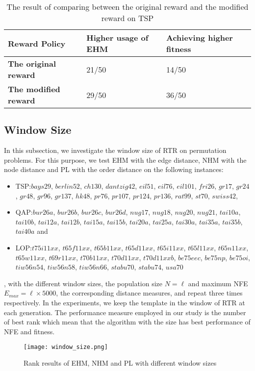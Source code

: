 \begin{table}[htbp]
    \centering
    \begin{tabular}{|l|l|l|}
    \hline
    \textbf{Reward Policy}       &\textbf{Higher usage of EHM}       & \textbf{Achieving higher fitness}  \\ \hline
    \textbf{The original reward} & 21/50 & 14/50   	 \\ \hline
    \textbf{The modified reward} & 29/50 & 36/50	\\ \hline
    \end{tabular} 
    \caption{The result of comparing between the original reward and the modified reward on TSP}
    \label{tb:reward}
\end{table}
\subsection*{Window Size}

In this subsection, we investigate the window size of RTR on permutation problems. For this purpose, we test EHM with the edge distance, NHM with the node distance and PL with the order distance on the following instances:
\begin{itemize}
    \item TSP:$bays29$, $ berlin52$, $ ch130$, $ dantzig42$, $eil51$, $ eil76$, $eil101$, $ fri26$, $ gr17$, $gr24$, $ gr48$, $ gr96$, $ gr137$, $ hk48$, $ pr76$, $ pr107$, $pr124$, $ pr136$, $rat99$, $st70$, $swiss42$, 
    \item QAP:$bur26a$, $ bur26b$, $ bur26c$, $bur26d$, $ nug17$, $nug18$, $ nug20$, $ nug21$, $tai10a$, $tai10b$, $tai12a$, $tai12b$, $tai15a$, $tai15b$, $tai20a$, $tai25a$, $tai30a$, $tai35a$, $tai35b$, $tai40a$ and
    \item LOP:$t75i11xx$, $t65f11xx$, $ t65b11xx$, $ t65d11xx$, $ t65i11xx$, $t65l11xx$, $ t65n11xx$, $ t65w11xx$, $ t69r11xx$, $t70b11xx$, $ t70d11xx$, $ t70d11xxb$, $be75eec$, $ be75np$, $ be75oi$, $ tiw56n54$, $tiw56n58$, $ tiw56n66$, $stabu70$, $ stabu74$, $ usa70$
\end{itemize} 
, with the different window sizes, the population size $N=\ell$ and maximum NFE $E_{max}=\ell\times 5000$, the corresponding distance measures, and repeat three times respectively. In the experiments, we keep the template in the window of RTR at each generation. The performance measure employed in our study is the number of best rank which mean that the algorithm with the size has best performance of NFE and fitness.

\begin{figure}[htbp] 
        \centering
        \texttt{[image: window\_size.png]}
        \caption{ Rank results of EHM, NHM and PL with different window sizes } 
        \label{fig:w_size}
\end{figure}




